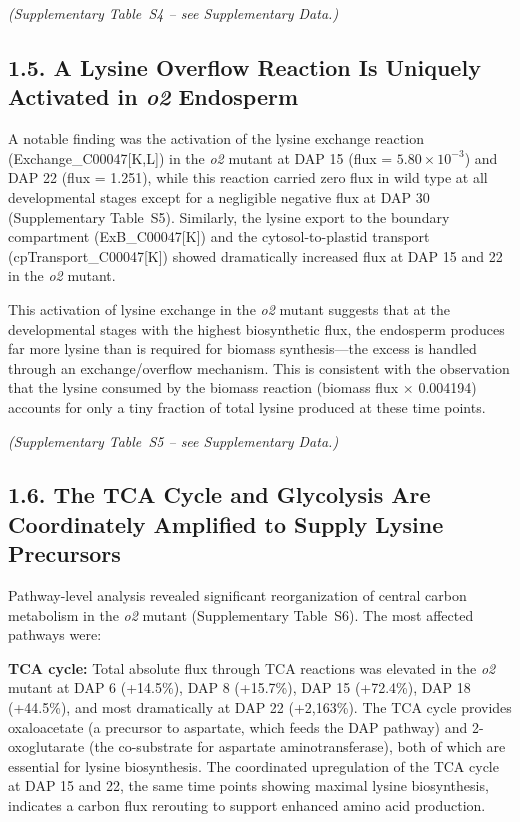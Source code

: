 \documentclass[12pt,a4paper]{article}
\begin{document}
\noindent\textit{(Supplementary Table~S4 -- see Supplementary Data.)}


\subsection{1.5. A Lysine Overflow Reaction Is Uniquely Activated in \textit{o2} Endosperm}

A notable finding was the activation of the lysine exchange reaction (Exchange\_C00047[K,L]) in the \textit{o2} mutant at DAP 15 (flux = $5.80 \times 10^{-3}$) and DAP 22 (flux = 1.251), while this reaction carried zero flux in wild type at all developmental stages except for a negligible negative flux at DAP 30 (Supplementary Table~S5). Similarly, the lysine export to the boundary compartment (ExB\_C00047[K]) and the cytosol-to-plastid transport (cpTransport\_C00047[K]) showed dramatically increased flux at DAP 15 and 22 in the \textit{o2} mutant.

This activation of lysine exchange in the \textit{o2} mutant suggests that at the developmental stages with the highest biosynthetic flux, the endosperm produces far more lysine than is required for biomass synthesis—the excess is handled through an exchange/overflow mechanism. This is consistent with the observation that the lysine consumed by the biomass reaction (biomass flux $\times$ 0.004194) accounts for only a tiny fraction of total lysine produced at these time points.


\noindent\textit{(Supplementary Table~S5 -- see Supplementary Data.)}


\subsection{1.6. The TCA Cycle and Glycolysis Are Coordinately Amplified to Supply Lysine Precursors}

Pathway-level analysis revealed significant reorganization of central carbon metabolism in the \textit{o2} mutant (Supplementary Table~S6). The most affected pathways were:

\textbf{TCA cycle:} Total absolute flux through TCA reactions was elevated in the \textit{o2} mutant at DAP 6 (+14.5\%), DAP 8 (+15.7\%), DAP 15 (+72.4\%), DAP 18 (+44.5\%), and most dramatically at DAP 22 (+2,163\%). The TCA cycle provides oxaloacetate (a precursor to aspartate, which feeds the DAP pathway) and 2-oxoglutarate (the co-substrate for aspartate aminotransferase), both of which are essential for lysine biosynthesis. The coordinated upregulation of the TCA cycle at DAP 15 and 22, the same time points showing maximal lysine biosynthesis, indicates a carbon flux rerouting to support enhanced amino acid production.
\end{document}
